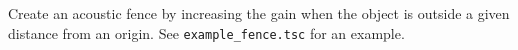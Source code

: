 Create an acoustic fence by increasing the gain when the object is
outside a given distance from an origin. See \verb!example_fence.tsc! for an example.


